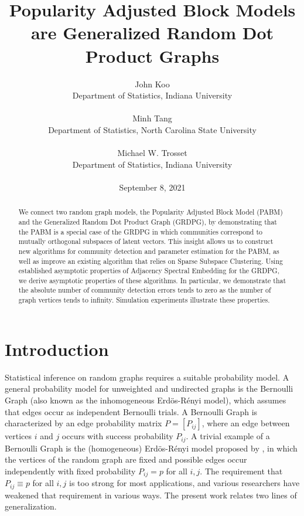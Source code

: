 \documentclass[12pt]{article}
\title{Popularity Adjusted Block Models are Generalized Random Dot Product Graphs}
\author{John Koo\\Department of Statistics, Indiana University\\ \\
Minh Tang\\Department of Statistics, North Carolina State University\\ \\
Michael W. Trosset\\Department of Statistics, Indiana University\\ \\
September 8, 2021}
\date{}
\def\spacingset#1{\renewcommand{\baselinestretch}%
{#1}\small\normalsize} \spacingset{1}
\providecommand{\tightlist}{%
  \setlength{\itemsep}{0pt}\setlength{\parskip}{0pt}}
\begin{document}
\maketitle

\begin{abstract}
We connect two random graph models, the Popularity Adjusted Block Model
(PABM) and the Generalized Random Dot Product Graph (GRDPG),
by demonstrating that the PABM is a special case of 
the GRDPG in which communities correspond to 
mutually orthogonal subspaces of latent vectors. 
This insight allows us to construct new algorithms for community detection
and parameter estimation for the PABM, 
as well as improve an existing algorithm 
that relies on Sparse Subspace Clustering. 
Using established asymptotic properties of 
Adjacency Spectral Embedding for the GRDPG, 
we derive asymptotic properties of these algorithms. 
In particular, we demonstrate that the absolute number of 
community detection errors tends to zero as 
the number of graph vertices tends to infinity. 
Simulation experiments illustrate these properties. 
\end{abstract}

\providecommand{\tightlist}{%
  \setlength{\itemsep}{0pt}\setlength{\parskip}{0pt}}
\newcommand{\diag}{\mathrm{diag}}
\newcommand{\tr}{\mathrm{Tr}}
\newcommand{\blockdiag}{\mathrm{blockdiag}}
\newcommand{\indep}{\stackrel{\mathrm{ind}}{\sim}}
\newcommand{\iid}{\stackrel{\mathrm{iid}}{\sim}}
\newcommand{\Bernoulli}{\mathrm{Bernoulli}}
\newcommand{\Betadist}{\mathrm{Beta}}
\newcommand{\BG}{\mathrm{BernoulliGraph}}
\newcommand{\PABM}{\mathrm{PABM}}
\newcommand{\RDPG}{\mathrm{RDPG}}
\newcommand{\GRDPG}{\mathrm{GRDPG}}
\newcommand{\Multinomial}{\mathrm{Multinomial}}
\newtheorem{theorem}{Theorem}
\newtheorem{lemma}{Lemma}
\newtheorem{proposition}{Proposition}
\theoremstyle{remark}
\newtheorem{remark}{Remark}
\theoremstyle{definition}
\newtheorem{definition}{Definition}
\newtheorem{example}{Example}
\newpage
\spacingset{1.5} %

\hypertarget{introduction}{%
\section{Introduction}\label{introduction}}

Statistical inference on random graphs requires a suitable probability
model.  A general probability model for unweighted and undirected
graphs is the Bernoulli Graph (also known as the inhomogeneous
Erd\"{o}s-R\'{e}nyi model), which assumes that edges occur as
independent Bernoulli trials.  A Bernoulli Graph is characterized by
an edge probability matrix $P=[P_{ij}]$, where an edge between
vertices $i$ and $j$ occurs with success probability $P_{ij}$.  A
trivial example of a Bernoulli Graph is the (homogeneous)
Erd\"{o}s-R\'{e}nyi model proposed by \citet{Gilbert:1959}, in which
the vertices of the random graph are fixed and possible edges occur
independently with fixed probability $P_{ij} = p$ for all $i,j$.  The requirement that
$P_{ij} \equiv p$ for all $i,j$ is too strong for most applications, and various
researchers have weakened that requirement in various ways.  The
present work relates two lines of generalization.
\end{document}
